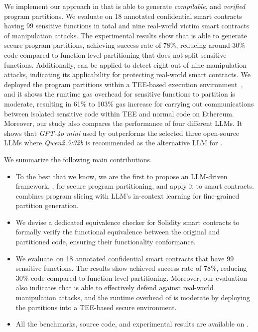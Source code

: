 We implement our approach in \tool that is able to generate \textit{compilable}, and \textit{verified} program partitions.
We evaluate \tool on 18 annotated confidential smart contracts having 99 sensitive functions in total and nine real-world victim smart contracts of manipulation attacks.
The experimental results show that \tool is able to generate secure program partitions, achieving success rate of 78\%, reducing around 30\% code compared to function-level partitioning that does not split sensitive functions.
Additionally, \tool can be applied to detect eight out of nine manipulation attacks, indicating its applicability for protecting real-world smart contracts. 
We deployed the program partitions within a TEE-based execution environment~\cite{russinovich2019ccf}, and it shows the runtime gas overhead for sensitive functions to partition is moderate, resulting in 61\% to 103\% gas increase for carrying out communications between isolated sensitive code within TEE and normal code on Ethereum.
Moreover, our study also compares the performance of four different LLMs. 
It shows that \emph{GPT-4o mini} used by \tool outperforms the selected three open-source LLMs where \emph{Qwen2.5:32b} is recommended as the alternative LLM for \tool.

We summarize the following main contributions.
\begin{itemize}
    \item To the best that we know, we are the first to propose an LLM-driven framework, \tool, for secure program partitioning, and apply it to smart contracts. \tool combines program slicing with LLM's in-context learning for fine-grained partition generation. 
    \item We devise a dedicated equivalence checker for Solidity smart contracts to formally verify the functional equivalence between the original and partitioned code, ensuring their functionality conformance.
    \item We evaluate~\tool on 18 annotated confidential smart contracts that have 99 sensitive functions. The results show \tool achieved success rate of 78\%, reducing 30\% code compared to function-level partitioning. Moreover, our evaluation also indicates that \tool is able to effectively defend against real-world manipulation attacks, and the runtime overhead of \tool is moderate by deploying the partitions into a TEE-based secure environment.
    \item All the benchmarks, source code, and experimental results are available on \website.
\end{itemize}

